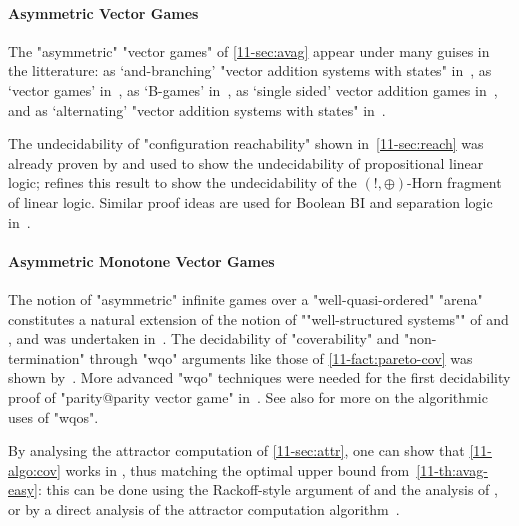 \paragraph{Asymmetric Vector Games}
The "asymmetric" "vector games" of \cref{11-sec:avag} appear
under many guises in the litterature: as `and-branching' "vector
addition systems with states"
in~\cite{Lincoln&Mitchell&Scedrov&Shankar:1992}, as `vector games'
in~\cite{Kanovich:1995}, as `B-games'
in~\cite{Raskin&Samuelides&VanBegin:2005}, as `single sided' vector
addition games in~\cite{Abdulla&al:2013}, and as `alternating'
"vector addition systems with states" in~\cite{Courtois&Schmitz:2014}.

The undecidability of "configuration reachability" shown
in~\cref{11-sec:reach} was already proven by  and used to show the
undecidability of propositional linear logic;
 refines this result to
show the undecidability of the $(!,\oplus)$-Horn fragment of linear
logic.  Similar proof ideas are used for Boolean BI and separation
logic in~\cite{Larchey&Galmiche:2013,Brotherston&Kanovich:2014}.

\paragraph{Asymmetric Monotone Vector Games}
The notion of "asymmetric" infinite games over a "well-quasi-ordered"
"arena" constitutes a natural extension of the notion of
""well-structured systems"" of
\citet{Abdulla&Cerans&Jonsson&Tsay:2000} and
\citet{Finkel&Schnoebelen:2001}, and was undertaken
in~\cite{Abdulla&Bouajjani&dOrso:2003,Raskin&Samuelides&VanBegin:2005}.
The decidability of "coverability" and "non-termination" through "wqo"
arguments like those of \cref{11-fact:pareto-cov} was shown
by~.  More
advanced "wqo" techniques were needed for the first decidability proof
of "parity@parity vector game" in~\cite{Abdulla&al:2013}.  See
also \cite{Schmitz&Schnoebelen:2012} for more on the algorithmic uses of
"wqos".

By analysing the attractor computation of \cref{11-sec:attr}, one can
show that \cref{11-algo:cov} works in \kEXP[2], thus matching the
optimal upper bound from~\cref{11-th:avag-easy}: this can be done using
the Rackoff-style argument of \citet{Courtois&Schmitz:2014} and the
analysis of \citet{Bozzelli&Ganty:2011}, or by a direct analysis of the
attractor computation algorithm~\cite{Lazic&Schmitz:2019}.

